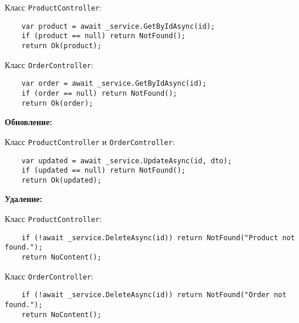 \documentclass[a4paper,12pt]{report}
\begin{document}
Класс \texttt{ProductController}:
\begin{verbatim}
    var product = await _service.GetByIdAsync(id);
    if (product == null) return NotFound();
    return Ok(product);
\end{verbatim}

Класс \texttt{OrderController}:
\begin{verbatim}
    var order = await _service.GetByIdAsync(id);
    if (order == null) return NotFound();
    return Ok(order);
\end{verbatim}

\textbf{Обновление:}

Класс \texttt{ProductController} и \texttt{OrderController}:
\begin{verbatim}
    var updated = await _service.UpdateAsync(id, dto);
    if (updated == null) return NotFound();
    return Ok(updated);
\end{verbatim}

\textbf{Удаление:}

Класс \texttt{ProductController}:
\begin{verbatim}
    if (!await _service.DeleteAsync(id)) return NotFound("Product not found.");
    return NoContent();
\end{verbatim}

Класс \texttt{OrderController}:
\begin{verbatim}
    if (!await _service.DeleteAsync(id)) return NotFound("Order not found.");
    return NoContent();
\end{verbatim}


\end{document}
